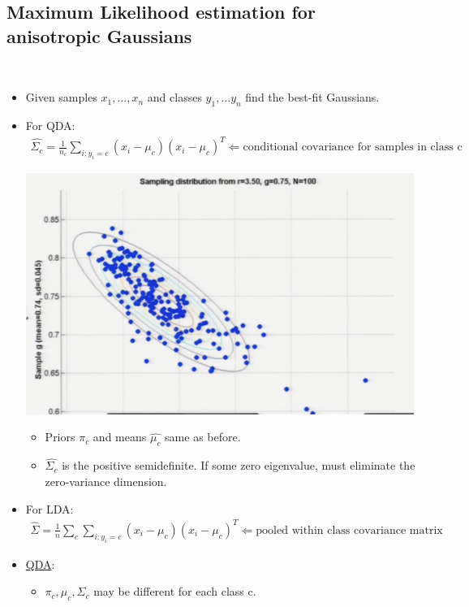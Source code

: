 \documentclass[10pt]{article}
\begin{document}
		\subsection*{Maximum Likelihood estimation for anisotropic Gaussians}
			\
			\begin{itemize}
				\item Given samples $x_{1}, \dots, x_{n}$ and classes $y_{1}, \dots y_{n}$ find the best-fit Gaussians.
				\item For QDA:
					\begin{align*}
						\hat{\Sigma_{c}} = \frac{1}{n_{c}} \sum_{i:y_{i}=c} (x_{i} - \mu_{c})(x_{i} - \mu_{c})^{T} \Leftarrow \text{conditional covariance for samples in class c}
					\end{align*}
					\begin{center}
						\includegraphics[scale=0.5]{images/smaple}
					\end{center}
					\begin{itemize}
					\item Priors $\pi_{c}$ and means $\hat{\mu_{c}}$ same as before.
					\item $\hat{\Sigma_{c}}$ is the positive semidefinite. If some zero eigenvalue, must eliminate the zero-variance dimension.
					\end{itemize}
				\item For LDA:
					\begin{align*}
						\hat{\Sigma} = \frac{1}{n} \sum_{c} \sum_{i:y_{i}=c} (x_{i} - \mu_{c})(x_{i} - \mu_{c})^{T} \Leftarrow \text{pooled within class covariance matrix}
					\end{align*}
				\item \underline{QDA}:
					\begin{itemize}
						\item $\pi_{c}, \mu_{c}, \Sigma_{c}$ may be different for each class c.

\end{itemize}
\end{itemize}
\end{document}
